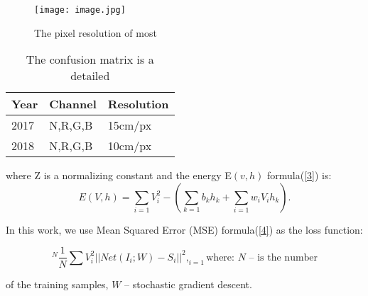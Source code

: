 \documentclass[acmlarge]{acmart}
\begin{document}
\begin{figure}[H]
    \centering
    \texttt{[image: image.jpg]}
    \caption{The pixel resolution of most }
    \label{1}
\end{figure}

\begin{table}[h!]
    \begin{center}
        \caption{The confusion matrix is a detailed}
        \label{2}
          \begin{tabular}{|p{3cm}|p{4cm}|p{4cm}|}
          \hline
           Year&Channel&Resolution\\
          \hline
          2017&N,R,G,B&15cm/px\\
          \hline
          2018&N,R,G,B&10cm/px\\
          \hline
          \end{tabular}
   \end{center}
\end{table}

\raggedright where Z is a normalizing constant and the energy E$(v, h)$ 
formula(\ref{3}) is: \newline
\begin{equation}
E(V,h)=\sum\limits
        _{i=1} 
V^2_i -\left( \sum\limits_{k=1} b_k h_k + \sum\limits_{i=1} w_i V_i h_k \right). \label{3}
\end{equation}

\raggedright In this work, we use Mean Squared Error (MSE) formula(\ref{4}) as the loss function:

\begin{equation}
             ^N
\frac{1}{N}\sum\limits V^2_i|| Net(I_i;W)-S_i||^2,
           _{i=1}
\label{4}  \text{where: $N$ – is the number}
\end{equation}

 of the training samples,     
 $W$  –  stochastic gradient descent.
 
\end{document}
